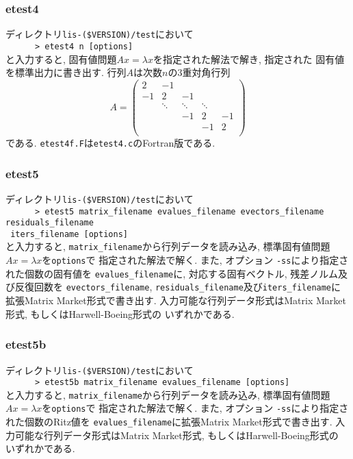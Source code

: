 \documentclass[a4paper]{jarticle}
\begin{document}
{{\subsubsection{etest4}
ディレクトリ{\tt lis-(\$VERSION)/test}において\\
 \verb+      > etest4 n [options]+\\
と入力すると, 固有値問題$Ax=\lambda x$を指定された解法で解き, 指定された
固有値を標準出力に書き出す. 
行列$A$は次数$n$の3重対角行列
\[
A = 
\left(
\begin{array}{ccccc}
2 & -1 &   &  &   \\
-1 & 2 & -1 &  &   \\
  & \ddots  & \ddots  & \ddots  &   \\
  &   & -1 & 2 & -1 \\
  &   &   & -1 & 2 \\
\end{array}
\right)
\]
である. 
{\tt etest4f.F}は{\tt etest4.c}のFortran版である. 

\subsubsection{etest5}
ディレクトリ{\tt lis-(\$VERSION)/test}において\\
 \verb+      > etest5 matrix_filename evalues_filename evectors_filename residuals_filename +\\
\verb+ iters_filename [options] +\\
と入力すると, {\tt matrix\_filename}から行列データを読み込み, 
標準固有値問題$Ax=\lambda x$を{\tt options}で
指定された解法で解く. 
また, オプション {\tt -ss}により指定された個数の固有値を
{\tt evalues\_filename}に, 対応する固有ベクトル, 残差ノルム及び反復回数を
{\tt evectors\_filename}, 
{\tt residuals\_filename}及び{\tt iters\_filename}に
拡張Matrix Market形式で書き出す.
入力可能な行列データ形式はMatrix Market形式, もしくはHarwell-Boeing形式の
いずれかである. 

\subsubsection{etest5b}
ディレクトリ{\tt lis-(\$VERSION)/test}において\\
 \verb+      > etest5b matrix_filename evalues_filename [options] +\\
と入力すると, {\tt matrix\_filename}から行列データを読み込み, 
標準固有値問題$Ax=\lambda x$を{\tt options}で
指定された解法で解く. 
また, オプション {\tt -ss}により指定された個数のRitz値を
{\tt evalues\_filename}に拡張Matrix Market形式で書き出す.
入力可能な行列データ形式はMatrix Market形式, もしくはHarwell-Boeing形式の
いずれかである. 

}}
\end{document}
